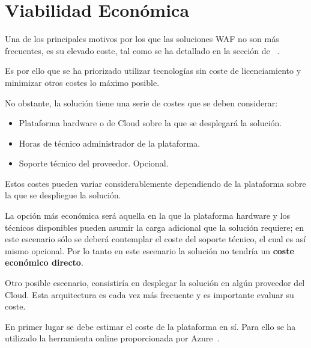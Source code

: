 \section{Viabilidad Económica}
\par Una de los principales motivos por los que las soluciones WAF no son más frecuentes, es su elevado coste, tal como se ha detallado en la sección de ~.
\par Es por ello que se ha priorizado utilizar tecnologías sin coste de licenciamiento y minimizar otros costes lo máximo posible.
\par No obstante, la solución tiene una serie de costes que se deben considerar:
\begin{itemize}
  \item Plataforma hardware o de Cloud sobre la que se desplegará la solución.
  \item Horas de técnico administrador de la plataforma.
  \item Soporte técnico del proveedor. Opcional.
\end{itemize}

\par Estos costes pueden variar considerablemente dependiendo de la plataforma sobre la que se despliegue la solución.
\par La opción más económica será aquella en la que la plataforma hardware y los técnicos disponibles pueden asumir la carga adicional que la solución requiere; en este escenario sólo se deberá contemplar el coste del
soporte técnico, el cual es así mismo opcional. Por lo tanto en este escenario la solución no tendría un {\bf coste económico directo}.

\par Otro posible escenario, consistiría en desplegar la solución en algún proveedor del Cloud. Esta arquitectura es cada vez más frecuente y es importante evaluar su coste.
\par En primer lugar se debe estimar el coste de la plataforma en sí. Para ello se ha utilizado la herramienta online proporcionada por Azure~\cite{azurecalculator}.


